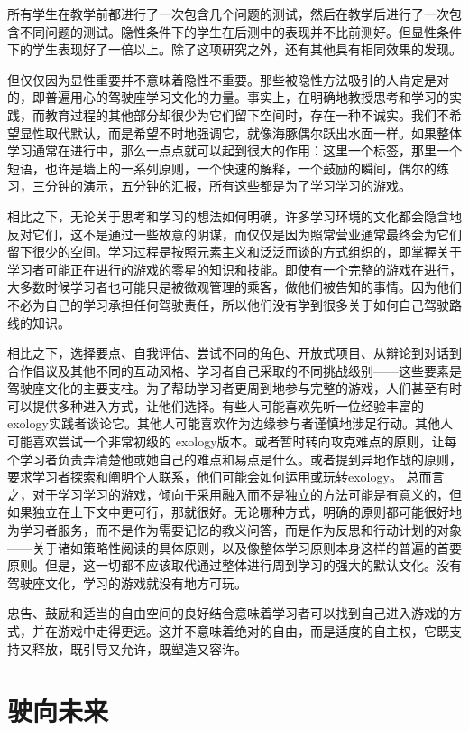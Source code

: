 所有学生在教学前都进行了一次包含几个问题的测试，然后在教学后进行了一次包含不同问题的测试。隐性条件下的学生在后测中的表现并不比前测好。但显性条件下的学生表现好了一倍以上。除了这项研究之外，还有其他具有相同效果的发现。

但仅仅因为显性重要并不意味着隐性不重要。那些被隐性方法吸引的人肯定是对的，即普遍用心的驾驶座学习文化的力量。事实上，在明确地教授思考和学习的实践，而教育过程的其他部分却很少为它们留下空间时，存在一种不诚实。我们不希望显性取代默认，而是希望不时地强调它，就像海豚偶尔跃出水面一样。如果整体学习通常在进行中，那么一点点就可以起到很大的作用：这里一个标签，那里一个短语，也许是墙上的一系列原则，一个快速的解释，一个鼓励的瞬间，偶尔的练习，三分钟的演示，五分钟的汇报，所有这些都是为了学习学习的游戏。

相比之下，无论关于思考和学习的想法如何明确，许多学习环境的文化都会隐含地反对它们，这不是通过一些故意的阴谋，而仅仅是因为照常营业通常最终会为它们留下很少的空间。学习过程是按照元素主义和泛泛而谈的方式组织的，即掌握关于学习者可能正在进行的游戏的零星的知识和技能。即使有一个完整的游戏在进行，大多数时候学习者也可能只是被微观管理的乘客，做他们被告知的事情。因为他们不必为自己的学习承担任何驾驶责任，所以他们没有学到很多关于如何自己驾驶路线的知识。

相比之下，选择要点、自我评估、尝试不同的角色、开放式项目、从辩论到对话到合作倡议及其他不同的互动风格、学习者自己采取的不同挑战级别——这些要素是驾驶座文化的主要支柱。为了帮助学习者更周到地参与完整的游戏，人们甚至有时可以提供多种进入方式，让他们选择。有些人可能喜欢先听一位经验丰富的exology实践者谈论它。其他人可能喜欢作为边缘参与者谨慎地涉足行动。其他人可能喜欢尝试一个非常初级的 exology版本。或者暂时转向攻克难点的原则，让每个学习者负责弄清楚他或她自己的难点和易点是什么。或者提到异地作战的原则，要求学习者探索和阐明个人联系，他们可能会如何运用或玩转exology。
总而言之，对于学习学习的游戏，倾向于采用融入而不是独立的方法可能是有意义的，但如果独立在上下文中更可行，那就很好。无论哪种方式，明确的原则都可能很好地为学习者服务，而不是作为需要记忆的教义问答，而是作为反思和行动计划的对象——关于诸如策略性阅读的具体原则，以及像整体学习原则本身这样的普遍的首要原则。但是，这一切都不应该取代通过整体进行周到学习的强大的默认文化。没有驾驶座文化，学习的游戏就没有地方可玩。

忠告、鼓励和适当的自由空间的良好结合意味着学习者可以找到自己进入游戏的方式，并在游戏中走得更远。这并不意味着绝对的自由，而是适度的自主权，它既支持又释放，既引导又允许，既塑造又容许。

\section*{驶向未来}

